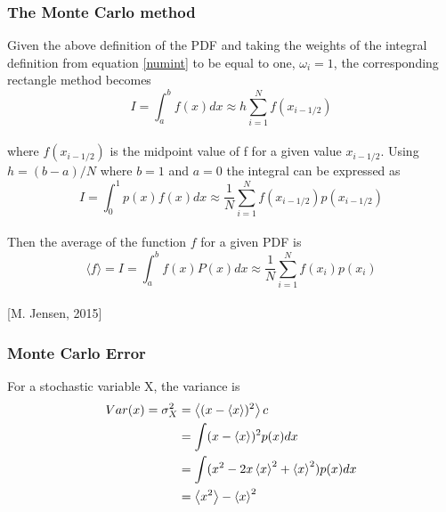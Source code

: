 \documentclass[%
reprint,
amsmath,amssymb,
aps,
]{revtex4-1}
\begin{document}
\subsubsection{The Monte Carlo method} \noindent 
Given the above definition of the PDF and taking the weights of the integral definition from equation \ref{numint} to be equal to one, $\omega_i = 1$, the corresponding rectangle method becomes \\
\begin{equation*}
I = \int_{a}^{b}f(x)dx \approx h\sum_{i=1}^{N}f(x_{i-1/2})
\end{equation*} \vspace{2mm} \\
where $f(x_{i-1/2})$ is the midpoint value of f for a given value $x_{i-1/2}$. Using $h = (b-a)/N$ where $b=1$ and $a=0$ the integral can be expressed as\vspace{2mm} \\
\begin{equation*}
I = \int_{0}^{1}p(x)f(x)dx \approx \dfrac{1}{N}\sum_{i=1}^{N}f(x_{i-1/2})p(x_{i-1/2})
\end{equation*} \vspace{2mm} \\
Then the average of the function $f$ for a given PDF is\vspace{2mm} \\
\begin{equation}\label{mcint}
\langle f \rangle = I = \int_{a}^{b}f(x)P(x)dx \approx \dfrac{1}{N}\sum_{i=1}^{N}f(x_i)p(x_i) 
\end{equation}\\

\hspace{52mm} [M. Jensen, 2015]

\subsubsection{Monte Carlo Error}
For a stochastic variable X, the variance is\\
\begin{align}\label{var}
	Var(x) = \sigma_X^2 &= \expval{(x-\expval{x})^2} c\nonumber \\
	&= \int(x-\expval{x})^2p(x)dx\nonumber\\
	&= \int(x^2-2x\expval{x}^2+ \expval{x}^2)p(x)dx\nonumber\\
	& = \expval{x^2} - \expval{x}^2 \nonumber \\ 
\end{align} \\
\end{document}
